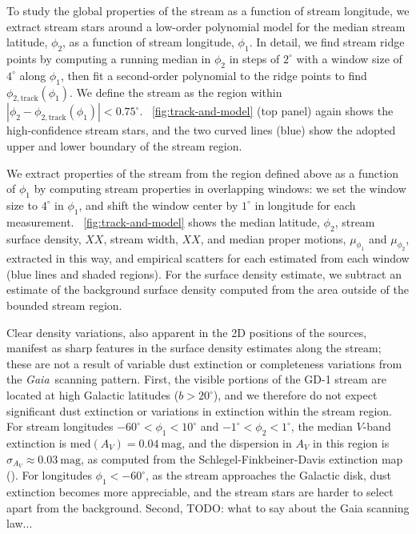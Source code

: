 \documentclass[modern]{aastex62}
\newcommand{\gaia}{\textsl{Gaia}}
\newcommand{\todo}[1]{{\color{red} TODO: #1}}
\begin{document}
To study the global properties of the stream as a function of stream longitude,
we extract stream stars around a low-order polynomial model for the median
stream latitude, $\phi_2$, as a function of stream longitude, $\phi_1$.
In detail, we find stream ridge points by computing a running median in $\phi_2$
in steps of $2^\circ$ with a window size of $4^\circ$ along $\phi_1$, then fit a
second-order polynomial to the ridge points to find $\phi_{2,
\textrm{track}}(\phi_1)$.
We define the stream as the region within $\left| \phi_2 - \phi_{2,
\textrm{track}}(\phi_1) \right| < 0.75^\circ$.
\figurename~\ref{fig:track-and-model} (top panel) again shows the
high-confidence stream stars, and the two curved lines (blue) show the adopted
upper and lower boundary of the stream region.

We extract properties of the stream from the region defined above as a function
of $\phi_1$ by computing stream properties in overlapping windows:
we set the window size to $4^\circ$ in $\phi_1$, and shift the window center by
$1^\circ$ in longitude for each measurement.
\figurename~\ref{fig:track-and-model} shows the median latitude, $\phi_2$,
stream surface density, $XX$, stream width, $XX$, and median proper motions,
$\mu_{\phi_1}$ and $\mu_{\phi_2}$, extracted in this way, and empirical scatters
for each estimated from each window (blue lines and shaded regions).
For the surface density estimate, we subtract an estimate of the background
surface density computed from the area outside of the bounded stream region.

Clear density variations, also apparent in the 2D positions of the sources,
manifest as sharp features in the surface density estimates along the stream;
these are not a result of variable dust extinction or completeness variations
from the \gaia\ scanning pattern.
First, the visible portions of the GD-1 stream are located at high Galactic
latitudes ($b > 20^\circ$), and we therefore do not expect significant dust
extinction or variations in extinction within the stream region.
For stream longitudes $-60^\circ < \phi_1 < 10^\circ$ and $-1^\circ < \phi_2 <
1^\circ$, the median $V$-band extinction is $\textrm{med}\left(A_V\right) =
0.04~\textrm{mag}$, and the dispersion in $A_V$ in this region is $\sigma_{A_V}
\approx 0.03~\textrm{mag}$, as computed from the Schlegel-Finkbeiner-Davis
extinction map (\citealt{Schlegel:1998}).
For longitudes $\phi_1 < -60^\circ$, as the stream approaches the Galactic disk,
dust extinction becomes more appreciable, and the stream stars are harder to
select apart from the background.
Second, \todo{what to say about the Gaia scanning law...}
\end{document}
